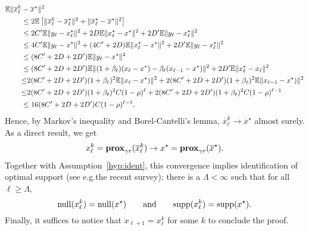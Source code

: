 \begin{align*}
    \mathbb{E} \|\overline x_{ {\ell}}^k &-  \overline {x}^\star\|^2  \\
    & \leq 2\mathbb{E}\left[\|\overline x_{ {\ell}}^k -  \overline x^{\star}_{ {\ell}}\|^2 + \|\overline x^{\star}_{ {\ell}} -  \overline{x}^\star\|^2\right] \\
    &\leq 2C' \mathbb{E} \|y_{\ell} - x_{ {\ell}}^\star\|^2 + 2D  \mathbb{E}\|x^{\star}_{ {\ell}} -  {x^\star}\|^2 + 2D'  \mathbb{E}\|y_\ell - {x}^\star_\ell\|^2\\
    &\leq 4C' \mathbb{E} \|y_{\ell} - x^\star\|^2  + (4C'+2D) \mathbb{E} \|x_{\ell}^\star - x^\star\|^2 + 2D'  \mathbb{E}\|y_\ell - {x}^\star_\ell\|^2  \\
    &\leq (8C'+2D+2D') \mathbb{E} \|y_{\ell} - x^\star\|^2 \\
    &\leq (8C'+2D+2D') \mathbb{E} \|(1+ {\beta}_\ell)({ {x_{\ell}}} -  {x^\star}) -  {\beta_\ell}({ {x_{\ell-1}}} -  {x^\star})\|^2 + 2D'  \mathbb{E}\|x^{\star}_{ {\ell}} -  {x_\ell}\|^2\\
    &{\leq} 2(8C'+2D+2D')(1+ {\beta}_\ell)^2\mathbb{E} \|{ {x_{\ell}}} -  {x^\star})\|^2  +2(8C'+2D+2D')(1+ {\beta}_\ell)^2 \mathbb{E}\|{ {x_{\ell-1}}} -  {x^\star})\|^2\\
    &{\leq} 2(8C'+2D+2D')(1+ {\beta}_\ell)^2 C (1-\rho)^\ell +2(8C'+2D+2D')(1+ {\beta}_\ell)^2 C (1-\rho)^{\ell-1} \\
    &\leq 16(8C'+2D+2D') C  (1-\rho)^{\ell-1}.
    \end{align*}
Hence, by Markov's inequality and Borel-Cantelli's lemma, $\overline x_{ {\ell}}^k \to  \overline {x}^\star$ almost surely. As a direct result, we get
$$
x_\ell^k = \mathbf{prox}_{\gamma r}( \overline x_{ {\ell}}^k ) \to {x}^\star = \mathbf{prox}_{\gamma r}(  \overline {x}^\star ).
$$
Together with Assumption~\ref{hyp:ident}, this convergence implies identification of optimal support (see e.g.\;the recent survey\;\cite[Cor.]{iutzeler2020SVAA}): there is a $\Lambda<\infty$ such that for all $\ell\geq \Lambda$,
$$
\mathrm{null}(x_\ell^k) = \mathrm{null}(x^\star) \qquad \text{and} \qquad \mathrm{supp}(x_\ell^k) = \mathrm{supp}(x^\star).
$$
Finally, it suffices to notice that $x_{\ell+1} = x_\ell^k$ for some $k$ to conclude the proof. 
    



